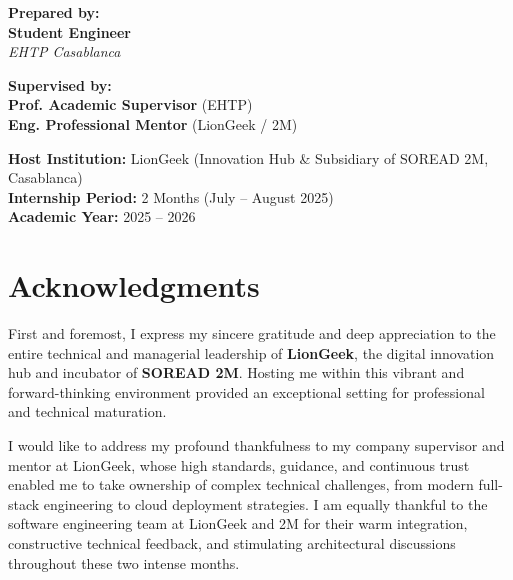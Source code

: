 \documentclass[12pt,a4paper,oneside]{report}
\begin{document}
\begin{titlepage}
\begin{minipage}{0.48\textwidth}
    \textbf{Prepared by:}\\[0.2cm]
    \textbf{Student Engineer}\\[0.1cm]
    \textit{EHTP Casablanca}
\end{minipage}
\hfill
\begin{minipage}{0.48\textwidth}
    \begin{flushright}
    \textbf{Supervised by:}\\[0.2cm]
    \textbf{Prof. Academic Supervisor} (EHTP)\\[0.1cm]
    \textbf{Eng. Professional Mentor} (LionGeek / 2M)
    \end{flushright}
\end{minipage}

\vfill
\textbf{Host Institution:} LionGeek (Innovation Hub \& Subsidiary of SOREAD 2M, Casablanca)\\[0.2cm]
\textbf{Internship Period:} 2 Months (July -- August 2025)\\[0.2cm]
\textbf{Academic Year:} 2025 -- 2026

\end{titlepage}

\setcounter{page}{1}

\chapter*{Acknowledgments}

First and foremost, I express my sincere gratitude and deep appreciation to the entire technical and managerial leadership of \textbf{LionGeek}, the digital innovation hub and incubator of \textbf{SOREAD 2M}. Hosting me within this vibrant and forward-thinking environment provided an exceptional setting for professional and technical maturation.

I would like to address my profound thankfulness to my company supervisor and mentor at LionGeek, whose high standards, guidance, and continuous trust enabled me to take ownership of complex technical challenges, from modern full-stack engineering to cloud deployment strategies. I am equally thankful to the software engineering team at LionGeek and 2M for their warm integration, constructive technical feedback, and stimulating architectural discussions throughout these two intense months.
\end{document}

